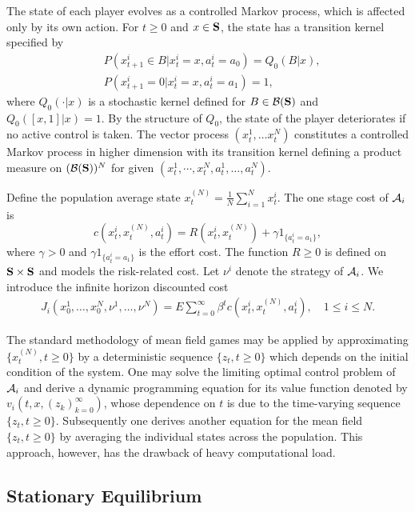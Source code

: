 \documentclass[graybox]{svmult}
\def\bS{{\bf S}}
\begin{document}
The state of each player evolves as a controlled Markov  process,
 which is affected only by its own action.
For $t\ge 0$ and $x\in \bS$,  the state has  a transition kernel specified  by
\begin{align}
&P(x_{t+1}^i\in B|x_t^i =x, a_t^i=a_0)= Q_0(B|x), \label{xa0}\\
&P(x_{t+1}^i=0|x_t^i =x, a_t^i=a_1)=1 , \label{xa1}
\end{align}
where $Q_0(\cdot|x)$ is a stochastic kernel defined for
$B\in {\cal B}(\bS) $
and $Q_0([x,1]|x)=1$.
 By the structure of $Q_0$, the state of the player deteriorates if no active control is taken.
The vector process $(x_t^1, \ldots x_t^N)$  constitutes a controlled Markov process in higher dimension with its transition kernel defining  a product measure on $({\cal B}(\bS))^N$ for given $(x_t^1,\cdots, x_t^N,a_t^1, \ldots, a_t^N)$.



Define the population average state
 $x^{(N)}_t= \frac{1}{N} \sum_{i=1}^N x_t^i$.
The one stage cost of ${\cal A}_i$   is
$$
c(x_t^i, x^{(N)}_t, a_t^i)= R(x_t^i, x^{(N)}_t) +\gamma 1_{\{a_t^i=a_1\}},
$$
where $\gamma>0$ and  $\gamma 1_{\{a_t^i=a_1\}}$ is the effort cost. The function $R\ge 0$  is defined on   $\bS\times\bS$ and models the risk-related cost. Let $\nu^i$ denote the strategy of ${\cal A}_i$.
 We  introduce
 the infinite horizon  discounted cost
\begin{align}
J_{i}(x_0^1, \ldots, x_0^N, \nu^1, \ldots, \nu^N)=
E \sum_{t=0}^\infty \beta^t c(x_t^i, x^{(N)}_t, a_t^i),
\quad 1\le i\le N. \label{jfb}
\end{align}

 The standard methodology of mean field games may be applied by approximating $\{x_t^{(N)}, t\ge 0\}$ by a deterministic sequence $\{z_t, t\ge 0\}$ which depends on the initial condition of the system.
One may solve the limiting optimal control problem of ${\cal A}_i$ and derive a dynamic programming equation for its value function denoted by $v_i(t,x, (z_k)_{k=0}^\infty)$, whose dependence on $t$ is due to the time-varying sequence $\{z_t, t\ge 0\}$. Subsequently one derives another equation for the mean field $\{z_t, t\ge 0\}$ by averaging the individual states across the population.
This approach,
 however, has the drawback of heavy computational load.


 \subsection{Stationary Equilibrium}
\end{document}
